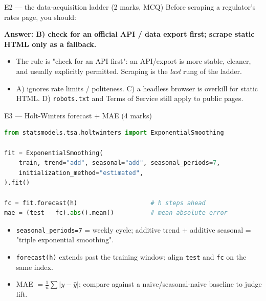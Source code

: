 \documentclass[aspectratio=169,11pt]{beamer}
\begin{document}
\begin{frame}[fragile]{E2 --- the data-acquisition ladder \hfill (2 marks, MCQ)}
Before scraping a regulator's rates page, you should:
\medskip

\textbf{Answer: B) \textcolor{cgreen}{check for an official API / data export first; scrape static HTML only as a fallback}.}
\begin{itemize}
  \item The rule is "check for an API first": an API/export is more stable, cleaner, and usually explicitly permitted. Scraping is the \emph{last} rung of the ladder.
  \item A) ignores rate limits / politeness. C) a headless browser is overkill for static HTML. D) \texttt{robots.txt} and Terms of Service still apply to public pages.
\end{itemize}
\end{frame}

\begin{frame}[fragile]{E3 --- Holt-Winters forecast + MAE \hfill (4 marks)}
\begin{lstlisting}[language=Python]
from statsmodels.tsa.holtwinters import ExponentialSmoothing

fit = ExponentialSmoothing(
    train, trend="add", seasonal="add", seasonal_periods=7,
    initialization_method="estimated",
).fit()

fc = fit.forecast(h)                    # h steps ahead
mae = (test - fc).abs().mean()          # mean absolute error
\end{lstlisting}
\begin{itemize}\footnotesize
  \item \texttt{seasonal\_periods=7} = weekly cycle; additive trend + additive seasonal = "triple exponential smoothing".
  \item \texttt{forecast(h)} extends past the training window; align \texttt{test} and \texttt{fc} on the same index.
  \item MAE $= \frac{1}{n}\sum |y-\hat y|$; compare against a naive/seasonal-naive baseline to judge lift.
\end{itemize}
\end{frame}
\end{document}
